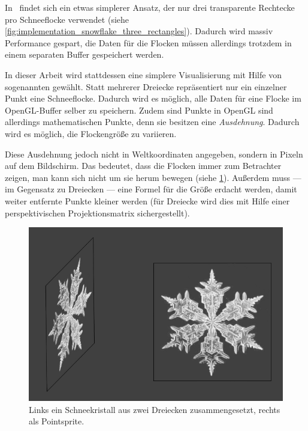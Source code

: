 In~\cite{Saltvik2006} findet sich ein etwas simplerer Ansatz, der nur
drei transparente Rechtecke pro Schneeflocke verwendet (siehe
\cref{fig:implementation_snowflake_three_rectangles}). Dadurch wird
massiv Performance gespart, die Daten für die Flocken müssen
allerdings trotzdem in einem separaten Buffer gespeichert werden.

In dieser Arbeit wird stattdessen eine simplere Visualisierung mit
Hilfe von sogenannten  gewählt. Statt
mehrerer Dreiecke repräsentiert nur ein einzelner Punkt eine
Schneeflocke. Dadurch wird es möglich, alle Daten für eine Flocke im
OpenGL-Buffer selber zu speichern. Zudem sind Punkte in OpenGL sind
allerdings mathematischen Punkte, denn sie besitzen eine
\emph{Ausdehnung}. Dadurch wird es möglich, die Flockengröße zu variieren.

Diese Ausdehnung jedoch nicht in Weltkoordinaten angegeben, sondern in
Pixeln auf dem Bildschirm. Das bedeutet, dass die Flocken immer zum
Betrachter zeigen, man kann sich nicht um sie herum bewegen (siehe
\cref{fig:implementation_point_sprite_vs_billboard}). Außerdem muss
--- im Gegensatz zu Dreiecken --- eine Formel für die Größe erdacht
werden, damit weiter entfernte Punkte kleiner werden (für Dreiecke
wird dies mit Hilfe einer perspektivischen Projektionsmatrix
sichergestellt).

\begin{figure}[ht]
    \centering
    \includegraphics{images/point_sprite_vs_billboard}
    \caption{Links ein Schneekristall aus zwei Dreiecken zusammengesetzt, rechts als Pointsprite.}
\label{fig:implementation_point_sprite_vs_billboard}
\end{figure}

